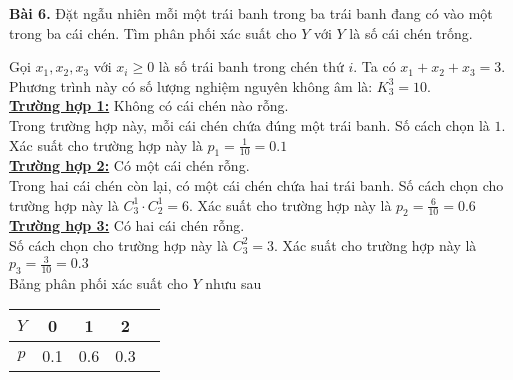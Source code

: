 \documentclass[12pt,a4paper]{article}
\begin{document}
\begin{mybox}
\textbf{Bài 6.} Đặt ngẫu nhiên mỗi một trái banh trong ba trái banh đang có vào một trong ba cái
chén. Tìm phân phối xác suất cho $Y$ với $Y$ là số cái chén trống.
\end{mybox}
Gọi $x_1, x_2, x_3$ với $x_i \geqslant 0$ là số trái banh trong chén thứ $i.$
Ta có $x_1 + x_2 + x_3 = 3.$ Phương trình này có số lượng nghiệm nguyên không âm là: $K^3_3 = 10.$\\
\textbf{\underline{Trường hợp 1:}} Không có cái chén nào rỗng.\\
Trong trường hợp này, mỗi cái chén chứa đúng một trái banh. Số cách chọn là $1.$ Xác suất cho trường hợp này là $p_1= \frac{1}{10} = 0.1$\\
\textbf{\underline{Trường hợp 2:}} Có một cái chén rỗng.\\
Trong hai cái chén còn lại, có một cái chén chứa hai trái banh. Số cách chọn cho trường hợp này là $C^1_3 \cdot C^1_2 = 6.$ Xác suất cho trường hợp này là $p_2 = \frac{6}{10} = 0.6$\\
\textbf{\underline{Trường hợp 3:}} Có hai cái chén rỗng.\\
Số cách chọn cho trường hợp này là $C^2_3 = 3.$ Xác suất cho trường hợp này là $p_3 = \frac{3}{10} = 0.3$\\
Bảng phân phối xác suất cho $Y$ nhưu sau
\begin{table}[H]
    \begin{center}
        \begin{tabular}{|c|c|c|c|c|}
            \hline 
            $Y$ & 0 & 1 & 2 \\ 
            \hline 
            $p$ & 0.1 & 0.6 & 0.3  \\ 
            \hline 
            \end{tabular} 
    \end{center}
\end{table}
\end{document}
